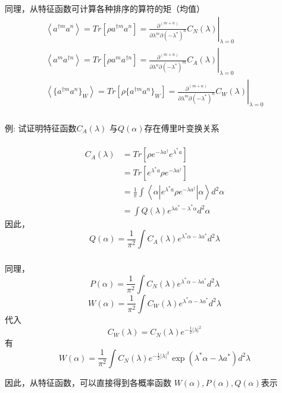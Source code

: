   \begin{frame} 
  \frametitle{}
   同理，从特征函数可计算各种排序的算符的矩（均值）
   \[ \begin{aligned}
    \left\langle a^{\dagger m} a ^n \right\rangle = Tr[\rho a^{\dagger m}a ^n ] = \left.\frac{\partial^{(m+n)} }{\partial \lambda ^m  \partial (-\lambda^*)^n } C_N (\lambda) \right|_{\lambda=0}\\
    \left\langle a ^m a^{\dagger n}  \right\rangle = Tr[\rho a ^m a^{\dagger n} ] = \left.\frac{\partial^{(m+n)} }{\partial \lambda ^n  \partial (-\lambda^*)^m } C_A (\lambda) \right|_{\lambda=0}\\
    \left\langle \{a^{\dagger m} a ^n\}_W \right\rangle = Tr[\rho\{a^{\dagger m} a ^n\}_W] = \left.\frac{\partial^{(m+n)} }{\partial \lambda ^m  \partial (-\lambda^*)^n } C_W (\lambda) \right|_{\lambda=0}
   \end{aligned}\] 
  \end{frame}

  \begin{frame} 
  \frametitle{}
   例: 试证明特征函数$C_A (\lambda)$ 与$Q(\alpha)$存在傅里叶变换关系 \\ {\vspace*{0.6em}} 
  \证~ 
  \[ \begin{aligned}
    C_A(\lambda) &= Tr[\rho e^{-\lambda a^{\dagger}} e^{ \lambda^* a}]\\
    &= Tr[e^{ \lambda^* a}\rho e^{-\lambda a^{\dagger}} ]\\
    &= \frac{1}{\pi} \int \left\langle \alpha | e^{ \lambda^* a}\rho e^{-\lambda a^{\dagger}}| \alpha\right\rangle d ^2 \alpha\\ 
    &=  \int Q(\lambda) e^{ \lambda a^{*}-\lambda^* \alpha }  d ^2 \alpha
   \end{aligned}\]
   因此， 
   \[ Q(\alpha) = \frac{1}{\pi^2} \int C_A(\lambda) e^{ \lambda^* \alpha- \lambda a^{*}}  d ^2 \lambda\]
  \end{frame}

  \begin{frame} 
  \frametitle{}
     同理，
     \[ P(\alpha) = \frac{1}{\pi^2} \int C_N(\lambda) e^{ \lambda^* \alpha- \lambda a^{*}}  d ^2 \lambda\]
     \[ W(\alpha) = \frac{1}{\pi^2} \int C_W(\lambda) e^{ \lambda^* \alpha- \lambda a^{*}}  d ^2 \lambda\]
     代入
     \[  C_W (\lambda)  =  C_N(\lambda) e^{- \frac{1}{2}|\lambda|^2}\]
     有 \[ W(\alpha) = \frac{1}{\pi^2} \int C_N(\lambda) e^{- \frac{1}{2}|\lambda|^2} \exp(\lambda^* \alpha- \lambda a^{*})  d ^2 \lambda\]

    因此，从特征函数，可以直接得到各概率函数 $ W(\alpha), P(\alpha), Q(\alpha)$表示
  \end{frame}

